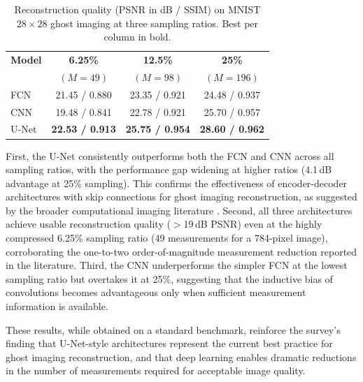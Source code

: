 \begin{table}[h]
\centering
\footnotesize
\caption{Reconstruction quality (PSNR in dB / SSIM) on MNIST $28\times28$ ghost imaging at three sampling ratios. Best per column in bold.}
\label{tab:our_results}
\begin{tabular}{@{}lccc@{}}
\toprule
\textbf{Model} & \textbf{6.25\%} & \textbf{12.5\%} & \textbf{25\%} \\
 & $(M{=}49)$ & $(M{=}98)$ & $(M{=}196)$ \\
\midrule
FCN  & 21.45 / 0.880 & 23.35 / 0.921 & 24.48 / 0.937 \\
CNN  & 19.48 / 0.841 & 22.78 / 0.921 & 25.70 / 0.957 \\
U-Net & \textbf{22.53 / 0.913} & \textbf{25.75 / 0.954} & \textbf{28.60 / 0.962} \\
\bottomrule
\end{tabular}
\end{table}

First, the U-Net consistently outperforms both the FCN and CNN across all sampling ratios, with the performance gap widening at higher ratios (4.1\,dB advantage at 25\% sampling). This confirms the effectiveness of encoder-decoder architectures with skip connections for ghost imaging reconstruction, as suggested by the broader computational imaging literature \citep{barbastathis2019}. Second, all three architectures achieve usable reconstruction quality ($>$19\,dB PSNR) even at the highly compressed 6.25\% sampling ratio (49 measurements for a 784-pixel image), corroborating the one-to-two order-of-magnitude measurement reduction reported in the literature. Third, the CNN underperforms the simpler FCN at the lowest sampling ratio but overtakes it at 25\%, suggesting that the inductive bias of convolutions becomes advantageous only when sufficient measurement information is available.

These results, while obtained on a standard benchmark, reinforce the survey's finding that U-Net-style architectures represent the current best practice for ghost imaging reconstruction, and that deep learning enables dramatic reductions in the number of measurements required for acceptable image quality.
